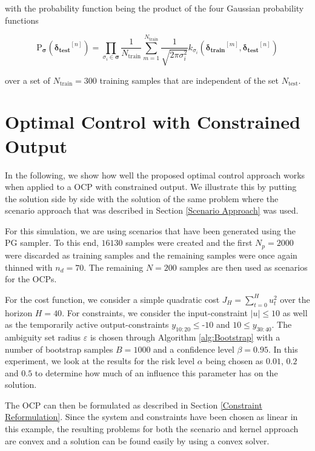 with the probability function being the product of the four Gaussian probability functions 

 \begin{equation} \label{Gaussian Probability}
\text{P}_{\boldsymbol{\sigma}} ( \boldsymbol{\delta_\text{test}}^{[n]} ) = \prod_{\sigma_i \in \boldsymbol{\sigma}} \frac{1}{N_\text{train}} \sum_{m = 1}^{N_\text{train}} \frac{1}{\sqrt{2 \pi \sigma_i^2}} k_{\sigma_i}(\boldsymbol{\delta_\text{train}}^{[m]} ,\boldsymbol{\delta_\text{test}}^{[n]})
\end{equation}

over a set of $N_\text{train} = 300$ training samples that are independent of the set $N_\text{test}$.


\section{Optimal Control with Constrained Output} \label{optimal control}

In the following, we show how well the proposed optimal control approach works when applied to a OCP with constrained output. We illustrate this by putting the solution side by side with the solution of the same problem where the scenario approach that was described in Section \ref{Scenario Approach} was used. 

For this simulation, we are using scenarios that have been generated using the PG sampler. To this end, $16130$ samples were created and the first $N_p = 2000$ were discarded as training samples and the remaining samples were once again thinned with $n_d = 70$. The remaining $N = 200$ samples are then used as scenarios for the OCPs.

For the cost function, we consider a simple quadratic cost $J_H = \sum_{t = 0}^H u_t^2$ over the horizon $H = 40$. For constraints, we consider the input-constraint $\left| u \right| \leq 10$ as well as the temporarily active output-constraints $y_{10:20} \leq \text{-} 10$ and $10 \leq y_{30:40}$.  The ambiguity set radius $\varepsilon$ is chosen through Algorithm \ref{alg:Bootstrap} with a number of bootstrap samples $B = 1000$ and a confidence level $\beta = 0.95$. In this experiment, we look at the results for the risk level $\alpha$ being chosen as $0.01$, $0.2$ and $0.5$ to determine how much of an influence this parameter has on the solution.

The OCP can then be formulated as described in Section \ref{Constraint Reformulation}. Since the system and constraints have been chosen as linear in this example, the resulting problems for both the scenario and kernel approach are convex and a solution can be found easily by using a convex solver.

